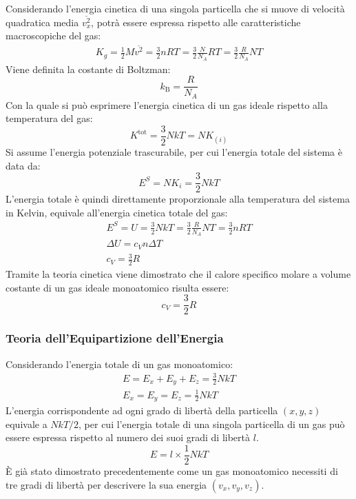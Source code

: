 \documentclass{article}
\numberwithin{equation}{subsection}
\begin{document}
Considerando l'energia cinetica di una singola particella che si muove di velocità quadratica media $\overline{v_x^2}$, potrà essere espressa rispetto alle caratteristiche 
macroscopiche del gas: 
\begin{gather*}
    K_g=\displaystyle\frac{1}{2}M\overline {v^2}=\frac{3}{2}nRT=\frac{3}{2}\frac{N}{N_A}RT=\frac{3}{2}\frac{R}{N_A}NT
\end{gather*}
Viene definita la costante di Boltzman: 
\begin{equation*}   
    k_\mathrm{B}=\displaystyle\frac{R}{N_A}
\end{equation*}
Con la quale si può esprimere l'energia cinetica di un gas ideale 
rispetto alla temperatura del gas:
\begin{equation*}
    K^\mathrm{tot}=\displaystyle\frac{3}{2}NkT=NK_{(i)}
\end{equation*}
Si assume l'energia potenziale trascurabile, per cui 
l'energia totale del sistema è data da:
\begin{equation}
    E^S=NK_i=\displaystyle\frac{3}{2}NkT
\end{equation}
L'energia totale è quindi direttamente proporzionale alla 
temperatura del sistema in Kelvin, equivale all'energia cinetica totale del gas: 
\begin{gather*}
    E^S= U=\displaystyle\frac{3}{2}NkT=\frac{3}{2}\frac{R}{N_A}NT=\frac{3}{2}nRT\\
    \Delta U=c_Vn\Delta T\\
    c_V=\displaystyle\frac{3}{2}R
\end{gather*}
Tramite la teoria cinetica viene dimostrato che il calore 
specifico molare a volume costante di un gas ideale 
monoatomico risulta essere: 
\begin{equation*}
    c_V=\displaystyle\frac{3}{2}R
\end{equation*}

\subsubsection{Teoria dell'Equipartizione dell'Energia}


Considerando l'energia totale di un gas monoatomico:
\begin{gather*}
    E=E_x+E_y+E_z=\displaystyle\frac{3}{2}NkT\\
    E_x=E_y=E_z=\displaystyle\frac{1}{2}NkT
\end{gather*}
L'energia corrispondente ad ogni grado di libertà della particella $(x,y,z)$ equivale a $NkT/2$, per cui l'energia totale di una singola particella di un 
gas può essere espressa rispetto al numero dei suoi gradi di libertà $l$. 
\begin{equation*}
    E=l\times\frac{1}{2}NkT
\end{equation*} 
\`{E} già stato dimostrato precedentemente come un gas monoatomico necessiti di tre gradi di libertà per descrivere la sua energia $(v_x,v_y,v_z)$.  
\end{document}
